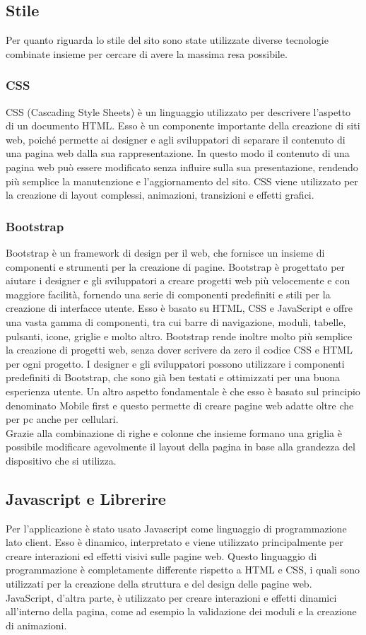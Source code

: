 \documentclass[a4paper,final,12pt]{report}
\begin{document}
\subsection{Stile}
Per quanto riguarda lo stile del sito sono state utilizzate diverse tecnologie combinate insieme per cercare di avere la massima resa possibile.

\subsubsection{CSS}
CSS (Cascading Style Sheets) è un linguaggio utilizzato per descrivere l'aspetto di un documento HTML. Esso è un componente importante della creazione di siti web, poiché permette ai designer e agli sviluppatori di separare il contenuto di una pagina web dalla sua rappresentazione. In questo modo il contenuto di una pagina web può essere modificato senza influire sulla sua presentazione, rendendo più semplice la manutenzione e l'aggiornamento del sito. CSS viene utilizzato per la creazione di layout complessi, animazioni, transizioni e effetti grafici. 

\subsubsection{Bootstrap}
Bootstrap è un framework di design per il web, che fornisce un insieme di componenti e strumenti per la creazione di pagine. Bootstrap è progettato per aiutare i designer e gli sviluppatori a creare progetti web più velocemente e con maggiore facilità, fornendo una serie di componenti predefiniti e stili per la creazione di interfacce utente. Esso è basato su HTML, CSS e JavaScript e offre una vasta gamma di componenti, tra cui barre di navigazione, moduli, tabelle, pulsanti, icone, griglie e molto altro.
Bootstrap rende inoltre molto più semplice la creazione di progetti web, senza dover scrivere da zero il codice CSS e HTML per ogni progetto. I designer e gli sviluppatori possono utilizzare i componenti predefiniti di Bootstrap, che sono già ben testati e ottimizzati per una buona esperienza utente.
Un altro aspetto fondamentale è che esso è basato sul principio denominato Mobile first e questo permette di creare pagine web adatte oltre che per pc anche per cellulari.\\ Grazie alla combinazione di righe e colonne che insieme formano una griglia è possibile modificare agevolmente il layout della pagina in base alla grandezza del dispositivo che si utilizza.

\subsection{Javascript e Librerire}
Per l'applicazione è stato usato Javascript come linguaggio di programmazione lato client. Esso è dinamico, interpretato e viene utilizzato principalmente per creare interazioni ed effetti visivi sulle pagine web. Questo linguaggio di programmazione è completamente differente rispetto a HTML e CSS, i quali sono utilizzati per la creazione della struttura e del design delle pagine web. JavaScript, d'altra parte, è utilizzato per creare interazioni e effetti dinamici all'interno della pagina, come ad esempio la validazione dei moduli e la creazione di animazioni.
\end{document}
